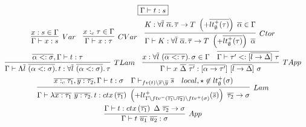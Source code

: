 \documentclass[11pt]{article}
\newcommand{\mathframebox}[1]{\framebox{$\displaystyle #1$}}
\newcommand{\ap}{~}
\newcommand{\ctx}[1]{ctx\left(#1\right)~}
\begin{document}
    \begin{figure}
        \begin{gather*}
            \mathframebox{\Gamma\vdash t : s} \\
            \begin{array}{ccc}
                \infer[Var]{\Gamma\vdash x : s}{x : s \in \Gamma} &
                \infer[CVar]{\Gamma\vdash x : \tau}{x :_c \tau \in \Gamma} &
                \infer[Ctor]{\Gamma\vdash K : \forall\overline{l}\ \overline{\alpha}\ldotp \overline{\tau}\to T \ap\left(+\overline{lt_\emptyset^+(\tau)}\right)\ap \overline{\alpha}}{K : \forall\overline{l}\ \overline{\alpha}\ldotp \overline{\tau}\to T \ap\left(+\overline{lt_\emptyset^+(\tau)}\right)\ap \overline{\alpha} \in \Gamma}
            \end{array} \\
            \begin{array}{cc}
                \infer[TLam]{
                    \Gamma\vdash\Lambda\overline{l}\ap\overline{(\alpha <: \sigma)}\ldotp t : \forall\overline{l}\ap\overline{(\alpha <: \sigma)}\ldotp\tau
                }{
                    \overline{\alpha <: \sigma}, \Gamma\vdash t : \tau
                } &
                \infer[TApp]{
                    \Gamma\vdash x\ap\overline{\Delta}\ap\overline{\tau'} : [\overline{\alpha\to\tau'}]\ap[\overline{l\to\Delta}]\ap\sigma
                }{
                    x : \forall\overline{l}\ap(\overline{\alpha <: \tau})\ldotp \sigma \in \Gamma
                    &
                    \overline{\Gamma\vdash\tau' <: [\overline{l\to\Delta}]\ap\tau}
                }
            \end{array} \\
            \infer[Lam]{
                \Gamma\vdash \lambda \overline{x : \tau_1} ~ \overline{y : \tau_2} \ldotp t : \ctx{\overline{\tau_1}} \left(+{lt_{\Gamma\setminus ftv^-(\overline{\tau_1}\cup\overline{\tau_2}) \setminus ftv^+(\sigma)}^+(\overline{s})}\right)~ \overline{\tau_2} \to \sigma
            }{
                \overline{x :_c \tau_1}, \overline{y : \tau_2}, \Gamma\vdash t : \sigma
                &
                \Gamma\vdash_{fv(t)\setminus \overline{x}\setminus\overline{y}}\overline{s}
                &
                local, \star \not\in lt_\emptyset^+(\sigma)
            } \\
            \infer[App]{
                \Gamma\vdash t \ap \overline{u_1} \ap \overline{u_2} : \sigma
            } {
                \Gamma\vdash t : \ctx{\overline{\tau_1}} \Delta~\overline{\tau_2}\to\sigma
}
\end{gather*}
\end{figure}
\end{document}

